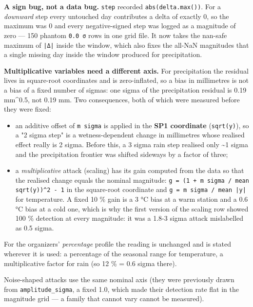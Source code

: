 \documentclass[10pt,a4paper]{article}
\begin{document}
\textbf{A sign bug, not a data bug.} \texttt{step} recorded \texttt{abs(delta.max())}. For a \emph{downward} step every untouched day contributes a delta of exactly 0, so the maximum was 0 and every negative-\allowbreak{}signed step was logged as a magnitude of zero — 150 phantom \texttt{0.0 σ} rows in one grid file. It now takes the nan-\allowbreak{}safe maximum of \texttt{|\allowbreak{}Δ|\allowbreak{}} inside the window, which also fixes the all-\allowbreak{}NaN magnitudes that a single missing day inside the window produced for precipitation.

\textbf{Multiplicative variables need a different axis.} For precipitation the residual lives in square-\allowbreak{}root coordinates and is zero-\allowbreak{}inflated, so a bias in millimetres is not a bias of a fixed number of sigmas: one sigma of the precipitation residual is 0.19 mm\textasciicircum{}0.5, not 0.19 mm. Two consequences, both of which were measured before they were fixed:

\begin{itemize}
\item an additive offset of \texttt{m sigma} is applied in the \textbf{SP1 coordinate}
(\texttt{sqrt(y)}), so a "2 sigma step" is a wetness-\allowbreak{}dependent change in millimetres whose realised effect really is 2 sigma. Before this, a 3 sigma rain step realised only \textasciitilde{}1 sigma and the precipitation frontier was shifted sideways by a factor of three;

\item a \emph{multiplicative} attack (scaling) has its gain computed from the data so that
the realised change equals the nominal magnitude: \texttt{g = (1 + m sigma /\allowbreak{} mean sqrt(y))\textasciicircum{}2 -\allowbreak{} 1} in the square-\allowbreak{}root coordinate and \texttt{g = m sigma /\allowbreak{} mean |\allowbreak{}y|\allowbreak{}} for temperature. A fixed 10 \% gain is a 3 °C bias at a warm station and a 0.6 °C bias at a cold one, which is why the first version of the scaling row showed 100 \% detection at every magnitude: it was a 1.8-\allowbreak{}3 sigma attack mislabelled as 0.5 sigma.

\end{itemize}

For the organizers' \emph{percentage} profile the reading is unchanged and is stated wherever it is used: a percentage of the seasonal range for temperature, a multiplicative factor for rain (so 12 \% = 0.6 sigma there).

Noise-\allowbreak{}shaped attacks use the same nominal axis (they were previously drawn from \texttt{amplitude\_\allowbreak{}sigma}, a fixed 1.0, which made their detection rate flat in the magnitude grid — a family that cannot vary cannot be measured).
\end{document}
